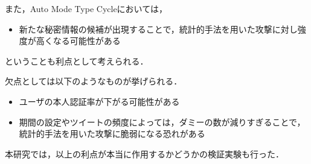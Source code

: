また，Auto Mode Type Cycleにおいては，
\begin{itemize}
\item 新たな秘密情報の候補が出現することで，統計的手法を用いた攻撃に対し強度が高くなる可能性がある
\end{itemize}
ということも利点として考えられる．

欠点としては以下のようなものが挙げられる．
\begin{itemize}
\item ユーザの本人認証率が下がる可能性がある
\item 期間の設定やツイートの頻度によっては，ダミーの数が減りすぎることで，統計的手法を用いた攻撃に脆弱になる恐れがある
\end{itemize}

本研究では，以上の利点が本当に作用するかどうかの検証実験も行った．

\newpage

